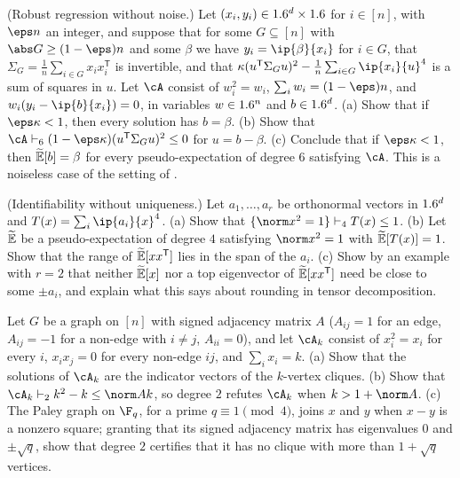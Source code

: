 \begin{refsection}
\begin{exercises}
\item\label{ex:sos:regression} \transfer\hard (Robust regression without noise.) Let $(x_i,y_i)\in1.6^d\times1.6$ for $i\in[n]$, with $\eps n$ an integer, and suppose that for some $G\subseteq[n]$ with $\abs G\ge(1-\eps)n$ and some $\beta$ we have $y_i=\ip{\beta}{x_i}$ for $i\in G$, that $\Sigma_G=\frac1n\sum_{i\in G}x_ix_i^{\mathsf T}$ is invertible, and that $\kappa(u^{\mathsf T}\Sigma_Gu)^2-\frac1n\sum_{i\in G}\ip{x_i}{u}^4$ is a sum of squares in $u$. Let $\cA$ consist of $w_i^2=w_i$, $\sum_iw_i=(1-\eps)n$, and $w_i(y_i-\ip{b}{x_i})=0$, in variables $w\in1.6^n$ and $b\in1.6^d$. (a) Show that if $\eps\kappa<1$, then every solution has $b=\beta$. (b) Show that $\cA\sosProves{6}(1-\eps\kappa)(u^{\mathsf T}\Sigma_Gu)^2\le0$ for $u=b-\beta$. (c) Conclude that if $\eps\kappa<1$, then $\widetilde{\mathbb{E}}[b]=\beta$ for every pseudo-expectation of degree $6$ satisfying $\cA$. This is a noiseless case of the setting of \textcite{Klivans2018}. 

\item\label{ex:sos:tensor} \transfer (Identifiability without uniqueness.) Let $a_1,\dots,a_r$ be orthonormal vectors in $1.6^d$ and $T(x)=\sum_i\ip{a_i}{x}^4$. (a) Show that $\{\norm x^2=1\}\sosProves{4}T(x)\le1$. (b) Let $\widetilde{\mathbb{E}}$ be a pseudo-expectation of degree $4$ satisfying $\norm x^2=1$ with $\widetilde{\mathbb{E}}[T(x)]=1$. Show that the range of $\widetilde{\mathbb{E}}[xx^{\mathsf T}]$ lies in the span of the $a_i$. (c) Show by an example with $r=2$ that neither $\widetilde{\mathbb{E}}[x]$ nor a top eigenvector of $\widetilde{\mathbb{E}}[xx^{\mathsf T}]$ need be close to some $\pm a_i$, and explain what this says about rounding in tensor decomposition. 

\item\label{ex:sos:clique} \transfer Let $G$ be a graph on $[n]$ with signed adjacency matrix $A$ ($A_{ij}=1$ for an edge, $A_{ij}=-1$ for a non-edge with $i\ne j$, $A_{ii}=0$), and let $\cA_k$ consist of $x_i^2=x_i$ for every $i$, $x_ix_j=0$ for every non-edge $ij$, and $\sum_ix_i=k$. (a) Show that the solutions of $\cA_k$ are the indicator vectors of the $k$-vertex cliques. (b) Show that $\cA_k\sosProves{2}k^2-k\le\norm Ak$, so degree $2$ refutes $\cA_k$ when $k>1+\norm A$. (c) The Paley graph on $\F_q$, for a prime $q\equiv1\pmod4$, joins $x$ and $y$ when $x-y$ is a nonzero square; granting that its signed adjacency matrix has eigenvalues $0$ and $\pm\sqrt q$, show that degree $2$ certifies that it has no clique with more than $1+\sqrt q$ vertices.


\end{exercises}
\end{refsection}
